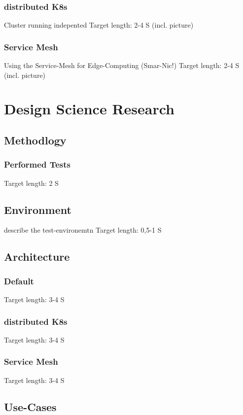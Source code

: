 \documentclass[MSC,Master,english]{twbook}%
\begin{document}
\subsection{distributed K8s}
Cluster running indepented
Target length: 2-4 S (incl. picture)
\subsection{Service Mesh}
Using the Service-Mesh for Edge-Computing (Smar-Nic!)
Target length: 2-4 S (incl. picture)



\chapter{Design Science Research}
\label{chap:dsr}

\section{Methodlogy}
\label{sec:dsrmethode}
\subsection{Performed Tests}
Target length: 2 S

\section{Environment}
\label{sec:env}
describe the test-environemtn
Target length: 0,5-1 S

\section{Architecture}
\label{sec:dsrarchitecture}
\subsection{Default}
Target length: 3-4 S
\subsection{distributed K8s}
Target length: 3-4 S
\subsection{Service Mesh}
Target length: 3-4 S

\section{Use-Cases}
\end{document}
